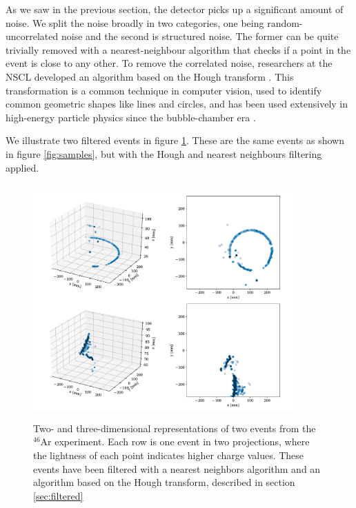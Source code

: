 \documentclass[review,number,sort&compress]{elsarticle}
\begin{document}
As we saw in the previous section, the detector picks up a significant amount of noise. We split the noise broadly in two categories,  one being random-uncorrelated noise and the second is structured noise. The former can be quite trivially removed with a nearest-neighbour algorithm that checks if a point in the event is close to any other. To remove the correlated noise, researchers at the NSCL developed an algorithm based on the Hough transform \cite{Newman1972}. This transformation is a common technique in computer vision, used to identify common geometric shapes like lines and circles, and has been used extensively in high-energy particle physics since the bubble-chamber era \cite{Hough:1959}.  %

We illustrate two filtered events in figure \ref{fig:samples_filtered}. These are the same events as shown in figure \ref{fig:samples}, but with the Hough and nearest neighbours filtering applied. 

\begin{figure}[ht]
\centering
\includegraphics[width=0.9\textwidth, height=9cm]{custom_work/examples_filtered.pdf}
\caption[Displaying filtered events in 2D and 3D]{Two- and three-dimensional representations of two events from the ${}^{46}$Ar experiment. Each row is one event in two projections, where the lightness of each point indicates higher charge values. These events have been filtered with a nearest neighbors algorithm and an algorithm based on the Hough transform, described in section \ref{sec:filtered}}\label{fig:samples_filtered}
\end{figure}
\end{document}
